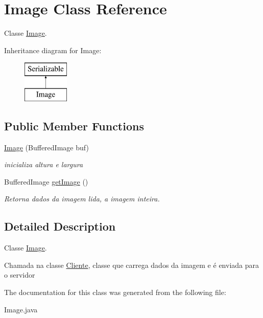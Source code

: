 \hypertarget{classImage}{\section{Image Class Reference}
\label{classImage}
}


Classe \hyperlink{classImage}{Image}.  


Inheritance diagram for Image\-:\begin{figure}[H]
\begin{center}
\leavevmode
\includegraphics[height=2.000000cm]{classImage}
\end{center}
\end{figure}
\subsection*{Public Member Functions}
\begin{DoxyCompactItemize}
\item 
\hypertarget{classImage_ad68ef9e688d436493c1ad4598d3a85a9}{\hyperlink{classImage_ad68ef9e688d436493c1ad4598d3a85a9}{Image} (Buffered\-Image buf)}\label{classImage_ad68ef9e688d436493c1ad4598d3a85a9}

\begin{DoxyCompactList}\small\item\em inicializa altura e largura \end{DoxyCompactList}\item 
\hypertarget{classImage_a49851ce62d807ed254a9fc218a14483f}{Buffered\-Image \hyperlink{classImage_a49851ce62d807ed254a9fc218a14483f}{get\-Image} ()}\label{classImage_a49851ce62d807ed254a9fc218a14483f}

\begin{DoxyCompactList}\small\item\em Retorna dados da imagem lida, a imagem inteira. \end{DoxyCompactList}\end{DoxyCompactItemize}


\subsection{Detailed Description}
Classe \hyperlink{classImage}{Image}. 

Chamada na classe \hyperlink{classCliente}{Cliente}, classe que carrega dados da imagem e é enviada para o servidor 

The documentation for this class was generated from the following file\-:\begin{DoxyCompactItemize}
\item 
Image.\-java\end{DoxyCompactItemize}
